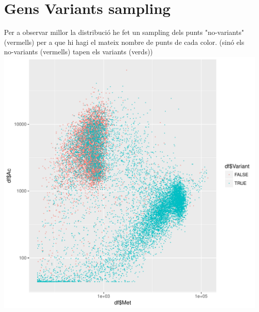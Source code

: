 \documentclass{article}\usepackage[]{graphicx}\usepackage[]{color}
\makeatletter
\def\maxwidth{ %
  \ifdim\Gin@nat@width>\linewidth
    \linewidth
  \else
    \Gin@nat@width
  \fi
}
\newenvironment{knitrout}{}{} %
\makeatother
\begin{document}
\section{Gens Variants sampling}
Per a observar millor la distribució he fet un sampling dels punts "no-variants" (vermells) per a que hi hagi el mateix nombre de punts de cada color. (sinó els no-variants (vermells) tapen els variants (verds))
\clearpage
\begin{knitrout}
\color{fgcolor}
\includegraphics[width=\maxwidth]{figure/plot_variant_sampling-1} 

\end{knitrout}
\clearpage
\end{document}
